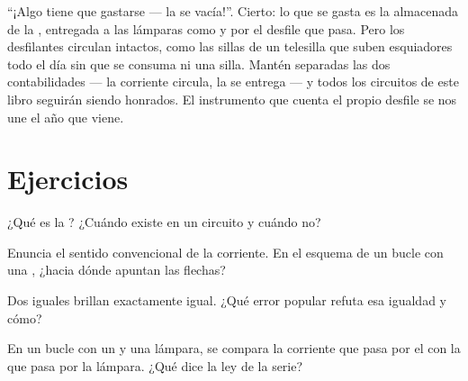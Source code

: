 \begin{remark}\label{rem:g7:circuits-series-parallel:whyhard}
``¡Algo tiene que gastarse --- la  se vacía!''. Cierto: lo que
se gasta es la \emph{} almacenada de la , entregada
a las lámparas como  y  por el desfile que pasa. Pero los
desfilantes circulan intactos, como las sillas de un telesilla que
suben esquiadores todo el día sin que se consuma ni una silla. Mantén
separadas las dos contabilidades --- la corriente circula, la
 se entrega --- y todos los circuitos de este libro seguirán
siendo honrados. El instrumento que cuenta el propio desfile se nos
une el año que viene.
\end{remark}

\section{Ejercicios}

\begin{exercise}[$\star$]\label{exo:g7:circuits-series-parallel:1}
¿Qué es la ? ¿Cuándo existe en un circuito y
cuándo no?
\end{exercise}

\begin{exercise}[$\star$]\label{exo:g7:circuits-series-parallel:2}
Enuncia el sentido convencional de la corriente. En el esquema de un
bucle con una , ¿hacia dónde apuntan las flechas?
\end{exercise}

\begin{exercise}[$\star$]\label{exo:g7:circuits-series-parallel:3}
Dos  iguales  brillan exactamente igual. ¿Qué
error popular refuta esa igualdad y cómo?
\end{exercise}

\begin{exercise}[$\star$]\label{exo:g7:circuits-series-parallel:4}
En un bucle  con un  y una lámpara, se compara la
corriente que pasa por el  con la que pasa por la lámpara. ¿Qué
dice la ley de la serie?
\end{exercise}

